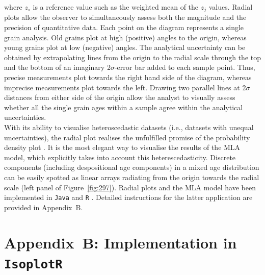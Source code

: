 \documentclass{article}
\begin{document}
\noindent where $z_\circ$ is a reference value such as the weighted
mean of the $z_j$ values. Radial plots allow the observer to
simultaneously assess both the magnitude and the precision of
quantitative data. Each point on the diagram represents a single grain
analysis. Old grains plot at high (positive) angles to the origin,
whereas young grains plot at low (negative) angles.  The analytical
uncertainty can be obtained by extrapolating lines from the origin to
the radial scale through the top and the bottom of an imaginary
2$\sigma$-error bar added to each sample point. Thus, precise
measurements plot towards the right hand side of the diagram, whereas
imprecise measurements plot towards the left.  Drawing two parallel
lines at 2$\sigma$ distances from either side of the origin allow the
analyst to visually assess whether all the single grain ages within a
sample agree within the analytical uncertainties.\\

With its ability to visualise heteroscedastic datasets (i.e., datasets
with unequal uncertainties), the radial plot realises the unfulfilled
promise of the probability density plot \citep{vermeesch2012b}.  It is
the most elegant way to visualise the results of the MLA model, which
explicitly takes into account this heterescedasticity.  Discrete
components (including despositional age components) in a mixed age
distribution can be easily spotted as linear arrays radiating from the
origin towards the radial scale (left panel of
Figure~\ref{fig:297}). Radial plots and the MLA model have been
implemented in \texttt{Java}
\citep[\texttt{RadialPlotter},][]{vermeesch2009c} and \texttt{R}
\citep[\texttt{IsoplotR},][]{vermeesch2018c}. Detailed instructions
for the latter application are provided in Appendix~B.

\section*{Appendix~B: Implementation in \texttt{IsoplotR}}
\end{document}
